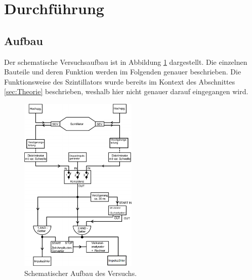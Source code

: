 \section{Durchführung}
\label{sec:Durchführung}

\subsection{Aufbau}

Der schematische Versuchsaufbau ist in Abbildung \ref{fig:aufbau1} dargestellt. Die einzelnen Bauteile und deren Funktion werden im Folgenden genauer beschrieben. Die 
Funktionsweise des Szintillators wurde bereits im Kontext des Abschnittes \ref{sec:Theorie} beschrieben, weshalb hier nicht genauer darauf eingegangen wird.

\begin{figure}
    \centering
    \includegraphics[width=0.5\textwidth]{data/aufbau_skizze_1.png}
    \caption{Schematischer Aufbau des Versuchs.}
    \label{fig:aufbau1}
\end{figure}

